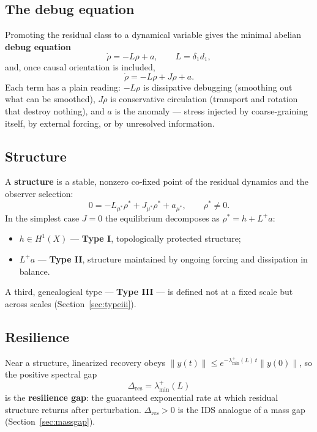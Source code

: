 \documentclass[11pt,a4paper]{article}
\theoremstyle{plain}
\begin{document}
\subsection{The debug equation}

Promoting the residual class to a dynamical variable gives the minimal abelian \textbf{debug equation}
\begin{equation}
\boxed{\ \dot\rho=-L\rho+a,\qquad L=\delta_1d_1,\ }
\end{equation}
and, once causal orientation is included,
\begin{equation}
\boxed{\ \dot\rho=-L\rho+J\rho+a.\ }
\label{eq:debug}
\end{equation}
Each term has a plain reading: $-L\rho$ is dissipative debugging (smoothing out what can be smoothed), $J\rho$ is conservative circulation (transport and rotation that destroy nothing), and $a$ is the anomaly --- stress injected by coarse-graining itself, by external forcing, or by unresolved information.

\subsection{Structure}

A \textbf{structure} is a stable, nonzero co-fixed point of the residual dynamics and the observer selection:
\begin{equation}
\boxed{\ 0=-L_{\mu^\ast}\rho^\ast+J_{\mu^\ast}\rho^\ast+a_{\mu^\ast},\qquad \rho^\ast\ne0.\ }
\end{equation}
In the simplest case $J=0$ the equilibrium decomposes as $\rho^\ast=h+L^+a$:
\begin{itemize}[itemsep=1pt,topsep=3pt]
\item $h\in H^1(X)$ --- \textbf{Type I}, topologically protected structure;
\item $L^+a$ --- \textbf{Type II}, structure maintained by ongoing forcing and dissipation in balance.
\end{itemize}
A third, genealogical type --- \textbf{Type III} --- is defined not at a fixed scale but across scales (Section~\ref{sec:typeiii}).

\subsection{Resilience}

Near a structure, linearized recovery obeys $\|y(t)\|\le e^{-\lambda^+_{\min}(L)\,t}\|y(0)\|$, so the positive spectral gap
\begin{equation}
\Delta_{\mathrm{res}}=\lambda^+_{\min}(L)
\end{equation}
is the \textbf{resilience gap}: the guaranteed exponential rate at which residual structure returns after perturbation. $\Delta_{\mathrm{res}}>0$ is the IDS analogue of a mass gap (Section~\ref{sec:massgap}).
\end{document}
